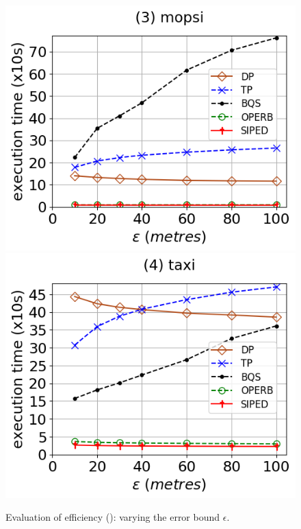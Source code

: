 \begin{figure}[tb!]
	\includegraphics[scale=0.315]{Figures/Exp-PED-time-epsilon-mopsi.png}	\hspace{1ex}
	\includegraphics[scale=0.315]{Figures/Exp-PED-time-epsilon-taxi.png}	\hspace{1ex}
	\vspace{-2.5ex}
	\caption{\small Evaluation of efficiency (\ped): varying the error bound $\epsilon$.}\label{fig:time-epsilon-ped}
	\vspace{-2ex}
\end{figure}

